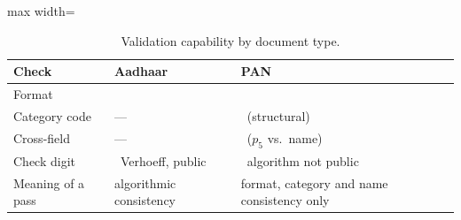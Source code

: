 \documentclass[12pt]{article}
\newcommand{\cmark}{\textcolor{cfuse}{\ding{51}}}
\newcommand{\xmark}{\textcolor{cbad}{\ding{55}}}
\begin{document}
\nolinenumbers
\clearpage
\begin{table}[H]
\caption{Validation capability by document type.}
\label{tab:capability}
\centering
\footnotesize
\setlength{\tabcolsep}{4pt}
\renewcommand{\arraystretch}{1.1}
\begin{adjustbox}{max width=\linewidth}
\begin{tabular}{@{}>{\raggedright\arraybackslash}p{2.0cm}>{\raggedright\arraybackslash}p{2.55cm}>{\raggedright\arraybackslash}p{3.0cm}@{}}
\toprule
Check & Aadhaar & PAN \\
\midrule
Format          & \cmark & \cmark \\
Category code   & ---    & \cmark\ (structural) \\
Cross-field     & ---    & \cmark\ ($p_5$ vs.\ name) \\
Check digit     & \cmark\ Verhoeff, public & \xmark\ algorithm not public \\
Meaning of a pass & algorithmic consistency & format, category and name consistency only \\
\bottomrule
\end{tabular}
\end{adjustbox}
\end{table}
\clearpage
\end{document}
